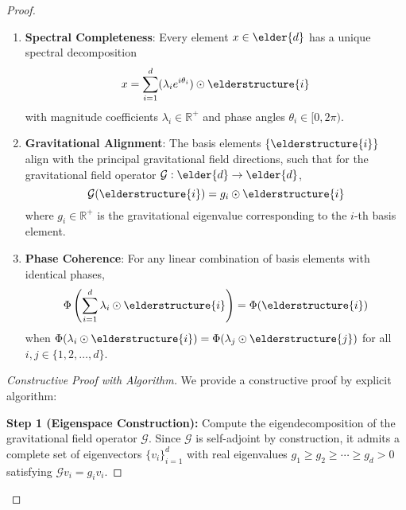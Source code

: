 \begin{proof}
\begin{theorem}
\begin{enumerate}
    \item \textbf{Spectral Completeness}: Every element $x \in \elder{d}$ has a unique spectral decomposition
    \begin{equation}
        x = \sum_{i=1}^{d} (\lambda_i e^{i\theta_i}) \odot \elderstructure{i}
    \end{equation}
    with magnitude coefficients $\lambda_i \in \mathbb{R}^+$ and phase angles $\theta_i \in [0, 2\pi)$.
    
    \item \textbf{Gravitational Alignment}: The basis elements $\{\elderstructure{i}\}$ align with the principal gravitational field directions, such that for the gravitational field operator $\mathcal{G}: \elder{d} \rightarrow \elder{d}$,
    \begin{equation}
        \mathcal{G}(\elderstructure{i}) = g_i \odot \elderstructure{i}
    \end{equation}
    where $g_i \in \mathbb{R}^+$ is the gravitational eigenvalue corresponding to the $i$-th basis element.
    
    \item \textbf{Phase Coherence}: For any linear combination of basis elements with identical phases,
    \begin{equation}
        \Phi\left(\sum_{i=1}^{d} \lambda_i \odot \elderstructure{i}\right) = \Phi(\elderstructure{i})
    \end{equation}
    when $\Phi(\lambda_i \odot \elderstructure{i}) = \Phi(\lambda_j \odot \elderstructure{j})$ for all $i,j \in \{1,2,\ldots,d\}$.
\end{enumerate}
\end{theorem}

\begin{proof}[Constructive Proof with Algorithm]
We provide a constructive proof by explicit algorithm:

\textbf{Step 1 (Eigenspace Construction):} 
Compute the eigendecomposition of the gravitational field operator $\mathcal{G}$. Since $\mathcal{G}$ is self-adjoint by construction, it admits a complete set of eigenvectors $\{v_i\}_{i=1}^{d}$ with real eigenvalues $g_1 \geq g_2 \geq \cdots \geq g_d > 0$ satisfying $\mathcal{G}v_i = g_i v_i$.


\end{proof}
\end{proof}
